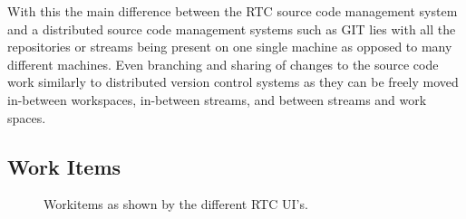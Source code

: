 With this the main difference between the RTC source code management system and a distributed source code management systems such as GIT lies with all the repositories or streams being present on one single machine as opposed to many different machines.
Even branching and sharing of changes to the source code work similarly to distributed version control systems as they can be freely moved in-between workspaces, in-between streams, and between streams and work spaces.

\subsection{Work Items}
\begin{figure}
\centering
{}

\caption{Workitems as shown by the different RTC UI's.}
\label{fig:wi}
\end{figure}
